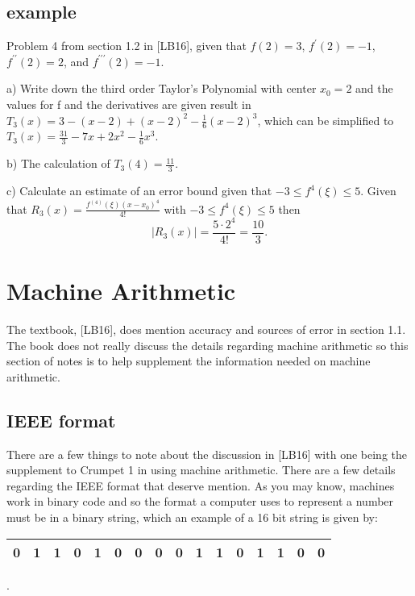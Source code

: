 \documentclass[twoside]{article}
\renewcommand{\cite}[1]{[#1]}
\def\ds{\displaystyle}
\begin{document}
\subsection{example} Problem 4 from section 1.2 in \cite{LB16}, given that $f(2)=3$, $\ds f^{\prime}(2)=-1$, $\ds f^{\prime \prime}(2)=2$, and $\ds f^{\prime \prime \prime}(2)=-1$. 

a) Write down the third order Taylor's Polynomial with center $\ds x_0=2$ and the values for f and the derivatives are given result in $\ds T_3(x) = 3-(x-2)+(x-2)^2-\frac 16 (x-2)^3$, which can be simplified to  $\ds T_3(x) = \frac {31}3 - 7x +2x^2 - \frac 16 x^3$.

b) The calculation of $\ds T_3(4) = \frac {11}3$.

c) Calculate an estimate of an error bound given that $\ds -3 \le f^4(\xi) \le 5$.  Given that $\ds R_3(x) = \frac {f^{(4)}(\xi)(x-x_0)^4}{4!}$ with  $\ds -3 \le f^4(\xi) \le 5$ then
$$\vert R_3(x) \vert = \frac {5\cdot 2^4}{4!} = \frac {10}3.$$

\section{Machine Arithmetic} The textbook, \cite{LB16}, does mention accuracy and sources of error in section 1.1. The book does not really discuss the details regarding machine arithmetic so this section of notes is to help supplement the information needed on machine arithmetic. 

\subsection{IEEE format}
There are a few things to note about the discussion in \cite{LB16} with one being the supplement to Crumpet 1 in using machine arithmetic. There are a few details regarding the IEEE format that deserve mention. As you may know, machines work in binary code and so the format a computer uses to represent a number must be in a binary string, which an example of a 16 bit string is given by:

\begin{tabular}{|c|c|c|c|c|c|c|c|c|c|c|c|c|c|c|c|}
\hline
0 & 1 & 1 & 0 & 1 & 0 & 0 & 0 & 0 & 1 & 1& 0& 1 &1 & 0 & 0\\
\hline

\end{tabular}. \par 
\end{document}
